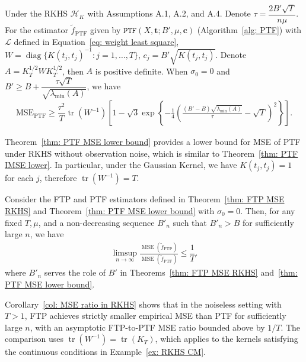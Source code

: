 \documentclass[twoside,11pt]{article}
\newcommand{\Bra}[1]{\left({#1}\right)} %
\newcommand{\SqBra}[1]{\left[{#1}\right]} %
\newcommand{\Set}[1]{\left\{{#1}\right\}} %
\begin{document}
\begin{theorem}
    \label{thm: PTF MSE lower bound}
    Under the RKHS $\mathcal{H}_K$ with Assumptions A.1, A.2, and A.4. Denote $\tau=\dfrac{2B'\sqrt{T}}{n\mu}.$ For the estimator $\widetilde{f}_{\mathrm{PTF}}$ given by $\mathtt{PTF}(X, \mathbf{t}; B',\mu, \mathbf{c})$ (Algorithm~\ref{alg: PTF}) with $\mathcal{L}$ defined in Equation~\eqref{eq: weight least square}, $W=\operatorname{diag}\{K(t_j,t_j)^{-1}:j=1,\ldots,T\}$, $c_j = B'\sqrt{K(t_j,t_j)}$. Denote $A = K_T^{1/2} W K_T^{1/2}$, then $A$ is positive definite.
    When $\sigma_0=0$ and $B'\geq B + \dfrac{\tau\sqrt T}{\sqrt{\lambda_{\min}(A)}}$, we have
    \begin{equation}
    \begin{aligned}
    \mathrm{MSE}_{\mathrm{PTF}}
    \geq
    \dfrac{\tau^2}{T}\operatorname{tr}(W^{-1})
    \SqBra{1
    -\sqrt{3}
    \exp\Set{
    -\frac14
    \Bra{
    \frac{(B'-B)\sqrt{\lambda_{\min}(A)}}{\tau}
    -\sqrt T
    }^2
    }}.
    \end{aligned}
    \label{eq: PTF MSE lower bound}
    \end{equation}
\end{theorem}
Theorem~\ref{thm: PTF MSE lower bound} provides a lower bound for MSE of PTF under RKHS without observation noise, which is similar to Theorem~\ref{thm: PTF IMSE lower}. In particular, under the Gaussian Kernel, we have $K(t_j,t_j)=1$ for each $j$, therefore $\operatorname{tr}(W^{-1})=T$.
\begin{corollary}
    Consider the FTP and PTF estimators defined in Theorem~\ref{thm: FTP MSE RKHS} and Theorem~\ref{thm: PTF MSE lower bound} with $\sigma_0 = 0$. Then, for any fixed $T, \mu$, and a non-decreasing sequence $B'_n$ such that $B'_n>B$ for sufficiently large $n$, we have
    \begin{equation}
        \begin{aligned}
            \limsup_{n\to\infty}
            \frac{\operatorname{MSE}(\widetilde f_{\mathrm{FTP}})}
            {\operatorname{MSE}(\widetilde f_{\mathrm{PTF}})}
            \leq \dfrac{1}{T}.
        \end{aligned}
    \end{equation}
    where $B'_n$ serves the role of $B'$ in Theorems~\ref{thm: FTP MSE RKHS} and~\ref{thm: PTF MSE lower bound}.
    \label{col: MSE ratio in RKHS}
\end{corollary}
Corollary~\ref{col: MSE ratio in RKHS} shows that in the noiseless setting with $T>1$, FTP achieves strictly smaller empirical MSE than PTF for sufficiently large $n$, with an asymptotic FTP-to-PTF MSE ratio bounded above by $1/T$. The comparison uses $\operatorname{tr}(W^{-1})=\operatorname{tr}(K_T)$, which applies to the kernels satisfying the continuous conditions in Example~\ref{ex: RKHS CM}.
\end{document}
